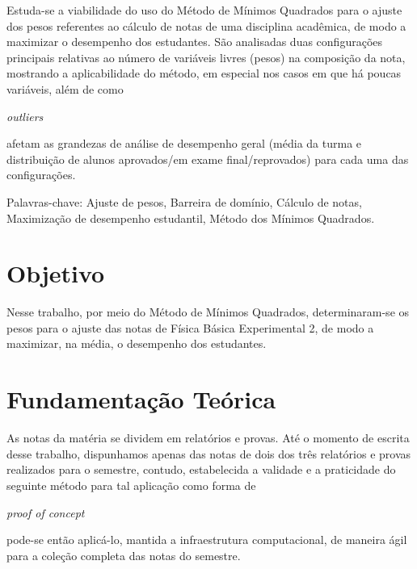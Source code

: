 \documentclass[11pt]{article}
\title{\vartitulo}
\author
{
        \varautor \\
        \varinstituicao \\
        \vardepartamento \\
        \varcontato
}
\date{}
\begin{document}
        \maketitle

        \abstract
        {
                Estuda-se a viabilidade do uso do Método de
                Mínimos Quadrados para o ajuste dos pesos
                referentes ao cálculo de notas de uma
                disciplina acadêmica, de modo a maximizar
                o desempenho dos estudantes. São analisadas duas
                configurações principais relativas ao número de
                variáveis livres (pesos) na composição da nota,
                mostrando a aplicabilidade do método, em
                especial nos casos em que há poucas
                variáveis, além de como
                \begin{otherlanguage}{english}
                        \textit{outliers}
                \end{otherlanguage}
                afetam as grandezas de análise de desempenho
                geral (média da turma e distribuição de
                alunos aprovados/em exame final/reprovados)
                para cada uma das configurações.
                \newline

                Palavras-chave:
                Ajuste de pesos,
                Barreira de domínio,
                Cálculo de notas,
                Maximização de desempenho estudantil,
                Método dos Mínimos Quadrados.

                \vspace{2\baselineskip}
        }



        \section{Objetivo}
		Nesse trabalho, por meio do Método de Mínimos
		Quadrados, determinaram-se os pesos para o
		ajuste das notas de Física Básica Experimental
		2, de modo a maximizar, na média, o
                desempenho dos estudantes.

        \section{Fundamentação Teórica}
		As notas da matéria se dividem em relatórios e
		provas. Até o momento de escrita desse trabalho,
		dispunhamos apenas das notas de dois dos três
		relatórios e provas realizados para o semestre,
		contudo, estabelecida a validade e a praticidade
		do seguinte método para tal aplicação como
		forma de
		\begin{otherlanguage}{english}
			\textit{proof of concept}
		\end{otherlanguage}
		pode-se então aplicá-lo, mantida a
		infraestrutura computacional, de maneira ágil
		para a coleção completa das notas do semestre.
\end{document}
